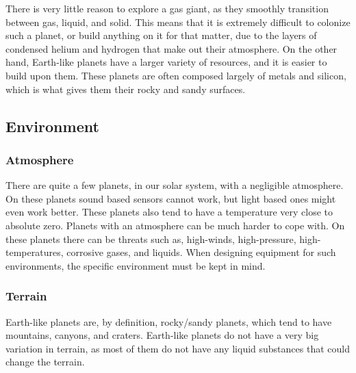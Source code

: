 There is very little reason to explore a gas giant, as they smoothly transition between gas, liquid, and solid. This means that it is extremely difficult to colonize such a planet, or build anything on it for that matter, due to the layers of condensed helium and hydrogen that make out their atmosphere\cite{outerplanetatmosphere}.
On the other hand, Earth-like planets have a larger variety of resources, and it is easier to build upon them. These planets are often composed largely of metals and silicon, which is what gives them their rocky and sandy surfaces.

\subsection{Environment}
\subsubsection{Atmosphere}
There are quite a few planets, in our solar system, with a negligible atmosphere. On these planets sound based sensors cannot work, but light based ones might even work better. These planets also tend to have a temperature very close to absolute zero\cite{planetstemp}.
Planets with an atmosphere can be much harder to cope with. On these planets there can be threats such as, high-winds, high-pressure, high-temperatures, corrosive gases, and liquids. When designing equipment for such environments, the specific environment must be kept in mind.

\subsubsection{Terrain}
Earth-like planets are, by definition, rocky/sandy planets, which tend to have mountains, canyons, and craters.
Earth-like planets do not have a very big variation in terrain, as most of them do not have any liquid substances that could change the terrain.

